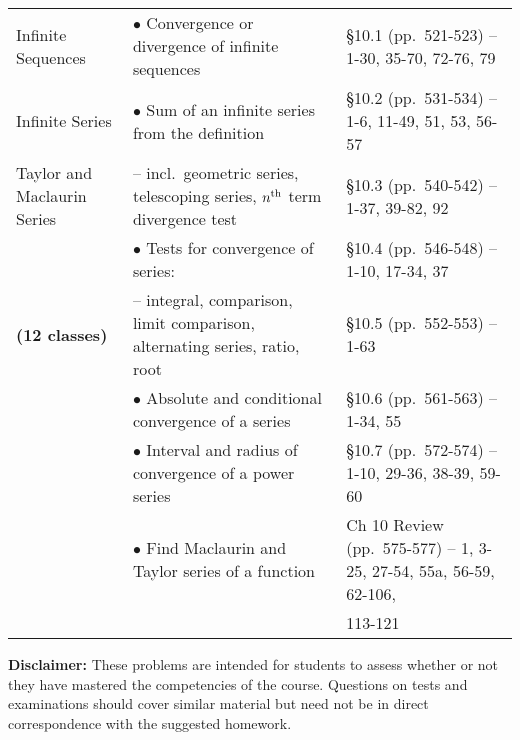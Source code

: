 {\begin{landscape}
\begin{longtable}[t]{||p{1.75in}|p{4.5in}|p{3.75in}||}
Infinite Sequences
	& $\bullet$ Convergence or divergence of infinite sequences
	& \S 10.1 (pp.~521-523) -- 1-30, 35-70, 72-76, 79
\\ Infinite Series
	& $\bullet$ Sum of an infinite series from the definition
	& \S 10.2 (pp.~531-534) -- 1-6, 11-49, 51, 53, 56-57
\\ Taylor and Maclaurin Series
	& \hspace{0.1in} -- incl.~geometric series, telescoping series, $n^{\rm th}$ term divergence test
	& \S 10.3 (pp.~540-542) -- 1-37, 39-82, 92
\\
	& $\bullet$ Tests for convergence of series:
	& \S 10.4 (pp.~546-548) -- 1-10, 17-34, 37
\\ \textbf{(12 classes)}
	&  \hspace{0.1in} -- integral, comparison, limit comparison, alternating series, ratio, root
	& \S 10.5 (pp.~552-553) -- 1-63
\\
	& $\bullet$ Absolute and conditional convergence of a series
	& \S 10.6 (pp.~561-563) -- 1-34, 55
\\
	& $\bullet$ Interval and radius of convergence of a power series
	& \S 10.7 (pp.~572-574) -- 1-10, 29-36, 38-39, 59-60
\\
	& $\bullet$ Find Maclaurin and Taylor series of a function
	& Ch 10 Review (pp.~575-577) -- 1, 3-25, 27-54, 55a, 56-59, 62-106,
\\
	&
	& \phantom{Ch 0 Review (pp.~575-577) - }113-121
\\
\hline
\end{longtable}
\noindent \textbf{Disclaimer:}  These problems are intended for students to assess whether or not they have mastered the competencies of the course.  Questions on tests and examinations should cover similar material but need not be in direct correspondence with the suggested homework.
\end{landscape}
}
